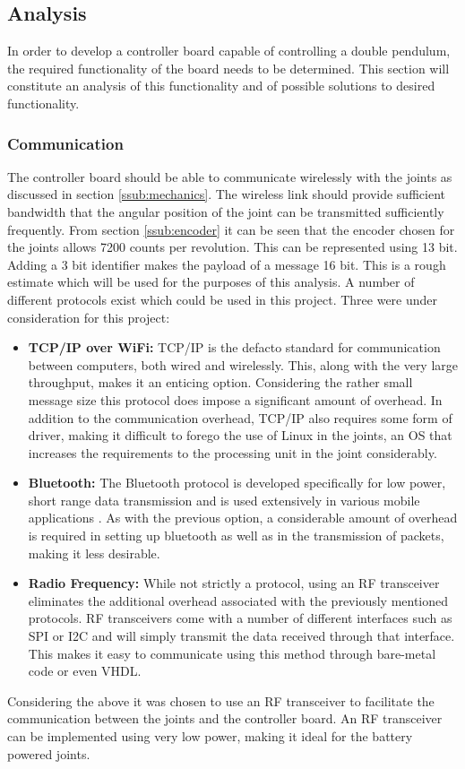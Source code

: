 \subsection{Analysis}
\label{sub:controller_board_analysis}

In order to develop a controller board capable of controlling a double pendulum, the required functionality of the board needs to be determined. 
This section will constitute an analysis of this functionality and of possible solutions to desired functionality.

\subsubsection{Communication} %
\label{ssub:communication}
The controller board should be able to communicate wirelessly with the joints as discussed in section \ref{ssub:mechanics}.
The wireless link should provide sufficient bandwidth that the angular position of the joint can be transmitted sufficiently frequently.
From section \ref{ssub:encoder} it can be seen that the encoder chosen for the joints allows 7200 counts per revolution.
This can be represented using 13 bit. 
Adding a 3 bit identifier makes the payload of a message 16 bit.
This is a rough estimate which will be used for the purposes of this analysis.
A number of different protocols exist which could be used in this project.
Three were under consideration for this project:
\begin{itemize}
	\item \textbf{TCP/IP over WiFi:} TCP/IP is the defacto standard for communication between computers, both wired and wirelessly.
	This, along with the very large throughput, makes it an enticing option.
	Considering the rather small message size this protocol does impose a significant amount of overhead.
	In addition to the communication overhead, TCP/IP also requires some form of driver, making it difficult to forego the use of Linux in the joints, an OS that increases the requirements to the processing unit in the joint considerably.
	\item \textbf{Bluetooth:} The Bluetooth protocol is developed specifically for low power, short range data transmission and is used extensively in various mobile applications \cite{bluetooth}.
	As with the previous option, a considerable amount of overhead is required in setting up bluetooth as well as in the transmission of packets, making it less desirable.
	\item \textbf{Radio Frequency:} While not strictly a protocol, using an RF transceiver eliminates the additional overhead associated with the previously mentioned protocols.
	RF transceivers come with a number of different interfaces such as SPI or I2C and will simply transmit the data received through that interface.
	This makes it easy to communicate using this method through bare-metal code or even VHDL.
\end{itemize}
Considering the above it was chosen to use an RF transceiver to facilitate the communication between the joints and the controller board.
An RF transceiver can be implemented using very low power, making it ideal for the battery powered joints.

